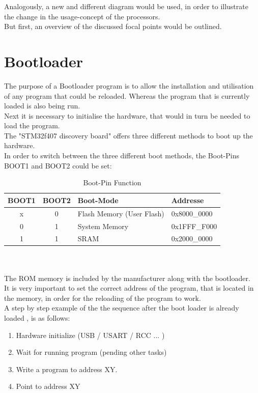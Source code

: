 Analogously, a new and different diagram would be used, in order to illustrate the
change in the usage-concept of the processors.\\

But first, an overview of the discussed focal points would be outlined.\\


\section{Bootloader}
The purpose of a Bootloader program is to allow the installation and utilisation
of any program that could be reloaded. Whereas the program that is currently loaded is also being run.\\
Next it is necessary to initialise the hardware, that would in turn be needed to load the program.\\
The "STM32f407 discovery board" offers three different methods to boot up the hardware.\citep{RB-12}\\
In order to switch between the three different boot methods, the Boot-Pins BOOT1
and BOOT2 could be set:
\begin{table}[ht]
\centering
\begin{tabular}{|c|c|l|l|}
\hline \hline
  BOOT1 & BOOT2 & Boot-Mode & Addresse\\ \hline
  x & 0 & Flash Memory (User Flash) & 0x8000\_0000\\
\hline
  0 & 1 & System Memory & 0x1FFF\_F000\\
\hline
 1  & 1 & SRAM & 0x2000\_0000\\
\hline
\end{tabular}
\caption{Boot-Pin Function}
\end{table}\\\\

The ROM memory is included by the manufacturer along with the bootloader.\\
It is very important to set the correct address of the program, that is located
in the memory, in order for the reloading of the program to work.\\
A step by step example of the the sequence after the boot loader is already
loaded , is as follows:

\begin{enumerate}
\item Hardware initialize (USB / USART / RCC ... )
\item Wait for running program (pending other tasks)
\item Write a program to address XY.
\item Point to address XY
\end{enumerate}

